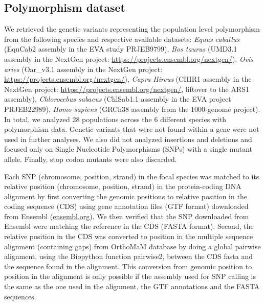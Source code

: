 \documentclass{article}
\begin{document}
    \subsection{Polymorphism dataset}
    \label{subsec:polymorphism-dataset}

    We retrieved the genetic variants representing the population level polymorphism from the following species and respective available datasets: \textit{Equus caballus} (EquCab2 assembly in the EVA study PRJEB9799\cite{alabri_whole_2020}), \textit{Bos taurus} (UMD3.1 assembly in the NextGen project: \url{https://projects.ensembl.org/nextgen/}), \textit{Ovis aries} (Oar\_v3.1 assembly in the NextGen project: \url{https://projects.ensembl.org/nextgen/}), \textit{Capra Hircus} (CHIR1 assembly in the NextGen project: \url{https://projects.ensembl.org/nextgen/}, liftover to the ARS1 assembly), \textit{Chlorocebus sabaeus} (ChlSab1.1 assembly in the EVA project PRJEB22989\cite{svardal_ancient_2017}), \textit{Homo sapiens} (GRCh38 assembly from the 1000-genome project\cite{consortium_integrated_2012, the1000genomesprojectconsortium_global_2015}).
    In total, we analyzed 28 populations across the 6 different species with polymorphism data.
    Genetic variants that were not found within a gene were not used in further analyses.
    We also did not analyzed insertions and deletions and focused only on Single Nucleotide Polymorphisms (SNPs) with a single mutant allele.
    Finally, stop codon mutants were also discarded.

    Each SNP (chromosome, position, strand) in the focal species was matched to its relative position (chromosome, position, strand) in the protein-coding DNA alignment by first converting the genomic positions to relative position in the coding sequence (CDS) using gene annotation files (GTF format) downloaded from Ensembl (\url{ensembl.org}).
    We then verified that the SNP downloaded from Ensembl were matching the reference in the CDS (FASTA format).
    Second, the relative position in the CDS was converted to position in the multiple sequence alignment (containing gaps) from OrthoMaM database\cite{ranwez_orthomam_2007, douzery_orthomam_2014, scornavacca_orthomam_2019} by doing a global pairwise alignment, using the Biopython function pairwise2, between the CDS fasta and the sequence found in the alignment.
    This conversion from genomic position to position in the alignment is only possible if the assembly used for SNP calling is the same as the one used in the alignment, the GTF annotations and the FASTA sequences.
\end{document}
